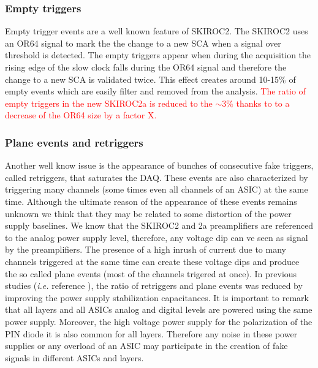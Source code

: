 \documentclass[final,3p,times,twocolumn]{elsarticle}
\newcommand{\todo}[1]{\textcolor{red}{{#1}}}
\begin{document}
\subsubsection*{Empty triggers}

Empty trigger events are a well known feature of SKIROC2. The SKIROC2 uses
an OR64 signal to mark the the change to a new SCA when a signal over threshold is
detected. The empty triggers appear when during
the acquisition the rising edge of the slow clock falls during the OR64 signal
and therefore the change to a new SCA is validated twice.
This effect creates around 10-15\% of empty events which are easily filter and removed from the
analysis. \todo{The ratio of empty triggers in the new SKIROC2a is reduced to the $\sim3\%$
thanks to to a decrease of the OR64 size by a factor X.}

\subsubsection*{Plane events and retriggers}

Another well know issue is the appearance of bunches of consecutive fake triggers, called retriggers,
that saturates the DAQ. These events are also
characterized by triggering many channels (some times even all channels of an ASIC) at the same time.
Although the ultimate reason of the appearance of these events remains unknown we
think that they may be related to some distortion of the
power supply baselines. We know that the SKIROC2 and 2a preamplifiers are referenced to the analog power supply level,
therefore, any voltage dip can ve seen as signal by the preamplifiers. The presence of a high inrush of current
due to many channels triggered at the same time can create these voltage dips
and produce the so called plane events (most of the channels trigered at once).
In previous studies ({\it i.e.} reference \cite{Amjad:2014tha}), the ratio of retriggers and plane events
was reduced by improving the power supply stabilization capacitances. It is important to remark that
all layers and all ASICs analog and digital levels are powered using the same power supply.
Moreover, the high voltage power supply for the polarization of the PIN diode it is also common for all layers.
Therefore any noise in
these power supplies or any overload of an ASIC may participate in the creation of fake signals
in different ASICs and layers.
\end{document}
